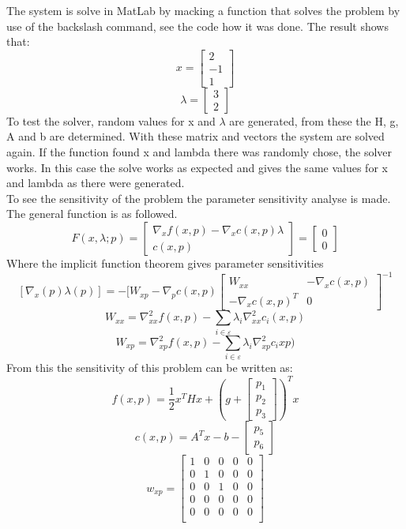 The system is solve in MatLab by macking a function that solves the problem by use of the backslash command, see the code how it was done. The result shows that:
\[x=\begin{bmatrix}
	2 \\ -1 \\ 1
\end{bmatrix}\]
\[\lambda=\begin{bmatrix}
	3 \\ 2 
\end{bmatrix}\]
To test the solver, random values for x and $\lambda$ are generated, from these the H, g, A and b are determined. With these matrix and vectors the system are solved again. If the function found x and lambda there was randomly chose, the solver works. In this case the solve works as expected and gives the same values for x and lambda as there were generated.\\
To see the sensitivity of the problem the parameter sensitivity analyse is made. The general function is as followed. 
\[F(x,\lambda;p)= \begin{bmatrix}
	\nabla_x f(x,p)- \nabla_x c(x,p)\lambda \\ c(x,p)
\end{bmatrix}=\begin{bmatrix}
0 \\ 0
\end{bmatrix}\]
Where the implicit function theorem gives parameter sensitivities
\[[\nabla_x(p) \lambda(p)]=-[W_{xp} -\nabla_p c(x,p)\begin{bmatrix}
W_{xx} & -\nabla_x c(x,p) \\ -\nabla_x c(x,p)^T & 0
\end{bmatrix}^{-1}\]
\[ W_{xx} = \nabla^2_{xx} f(x,p) - \sum\limits_{i\in\varepsilon} \lambda_i\nabla^2_{xx}c_i(x,p)\]
\[ W_{xp} = \nabla^2_{xp} f(x,p) - \sum\limits_{i\in\varepsilon} \lambda_i\nabla^2_{xp}c_i{xp})\]
From this the sensitivity of this problem can be written as:
\[f(x,p) = \dfrac{1}{2}x^T Hx+(g+\begin{bmatrix} p_1 \\ p_2 \\ p_3 \end{bmatrix})^T x\]
\[c(x,p)=A^Tx-b-\begin{bmatrix} p_5 \\ p_6\end{bmatrix}\]
\[w_{xp}=\begin{bmatrix}
1&0&0&0&0\\0&1&0&0&0\\0&0&1&0&0\\0&0&0&0&0\\0&0&0&0&0\\\end{bmatrix}\]
